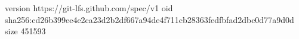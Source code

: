 version https://git-lfs.github.com/spec/v1
oid sha256:cd26b399ee4e2ca23d2b2df667a94de4f711cb28363fedfbfad2dbc0d77a9d0d
size 451593
